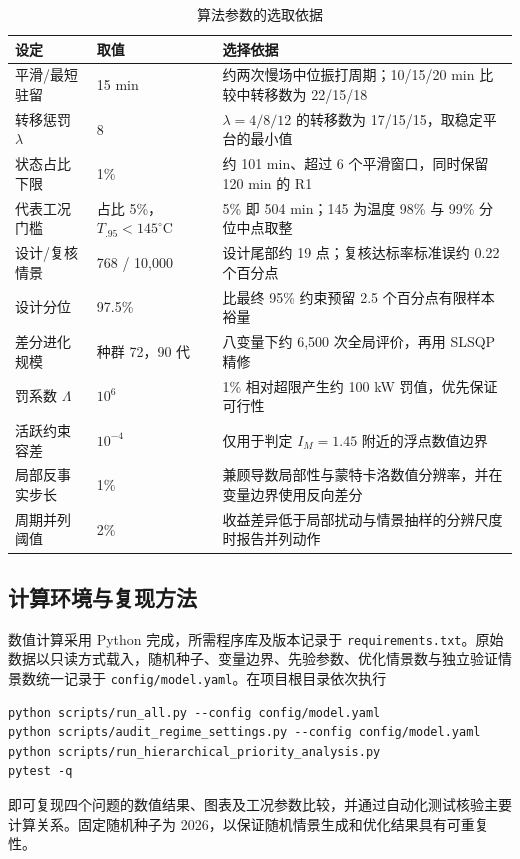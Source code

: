 \begin{table}[H]
\centering
\caption{算法参数的选取依据}
\label{tab:algorithmset}
\begin{tabularx}{0.98\textwidth}{C{3.0cm}C{3.0cm}L}
\toprule
设定 & 取值 & 选择依据\\
\midrule
平滑/最短驻留 & 15 min & 约两次慢场中位振打周期；10/15/20 min 比较中转移数为 22/15/18\\
转移惩罚 $\lambda$ & 8 & $\lambda=4/8/12$ 的转移数为 17/15/15，取稳定平台的最小值\\
状态占比下限 & 1\% & 约 101 min、超过 6 个平滑窗口，同时保留 120 min 的 R1\\
代表工况门槛 & 占比 5\%，$T_{.95}<145^\circ$C & 5\% 即 504 min；145 为温度 98\% 与 99\% 分位中点取整\\
设计/复核情景 & 768 / 10,000 & 设计尾部约 19 点；复核达标率标准误约 0.22 个百分点\\
设计分位 & 97.5\% & 比最终 95\% 约束预留 2.5 个百分点有限样本裕量\\
差分进化规模 & 种群 72，90 代 & 八变量下约 6,500 次全局评价，再用 SLSQP 精修\\
罚系数 $\Lambda$ & $10^6$ & 1\% 相对超限产生约 100 kW 罚值，优先保证可行性\\
活跃约束容差 & $10^{-4}$ & 仅用于判定 $I_M=1.45$ 附近的浮点数值边界\\
局部反事实步长 & 1\% & 兼顾导数局部性与蒙特卡洛数值分辨率，并在变量边界使用反向差分\\
周期并列阈值 & 2\% & 收益差异低于局部扰动与情景抽样的分辨尺度时报告并列动作\\
\bottomrule
\end{tabularx}
\end{table}

\subsection{计算环境与复现方法}

数值计算采用 Python 完成，所需程序库及版本记录于 \texttt{requirements.txt}。原始数据以只读方式载入，随机种子、变量边界、先验参数、优化情景数与独立验证情景数统一记录于 \texttt{config/model.yaml}。在项目根目录依次执行
\begin{verbatim}
python scripts/run_all.py --config config/model.yaml
python scripts/audit_regime_settings.py --config config/model.yaml
python scripts/run_hierarchical_priority_analysis.py
pytest -q
\end{verbatim}
即可复现四个问题的数值结果、图表及工况参数比较，并通过自动化测试核验主要计算关系。固定随机种子为 2026，以保证随机情景生成和优化结果具有可重复性。

